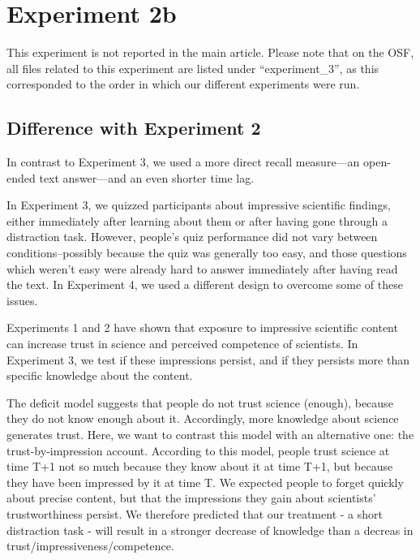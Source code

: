 \documentclass[
  english,
  doc,floatsintext]{apa6}
\begin{document}
\section{Experiment 2b}\label{exp2b}

This experiment is not reported in the main article. Please note that on the OSF, all files related to this experiment are listed under ``experiment\_3'', as this corresponded to the order in which our different experiments were run.

\subsection{Difference with Experiment 2}\label{difference-with-experiment-2}

\FloatBarrier

In contrast to Experiment 3, we used a more direct recall measure---an open-ended text answer---and an even shorter time lag.

In Experiment 3, we quizzed participants about impressive scientific findings, either immediately after learning about them or after having gone through a distraction task. However, people's quiz performance did not vary between conditions--possibly because the quiz was generally too easy, and those questions which weren't easy were already hard to answer immediately after having read the text. In Experiment 4, we used a different design to overcome some of these issues.

Experiments 1 and 2 have shown that exposure to impressive scientific content can increase trust in science and perceived competence of scientists. In Experiment 3, we test if these impressions persist, and if they persists more than specific knowledge about the content.

The deficit model suggests that people do not trust science (enough), because they do not know enough about it. Accordingly, more knowledge about science generates trust. Here, we want to contrast this model with an alternative one: the trust-by-impression account. According to this model, people trust science at time T+1 not so much because they know about it at time T+1, but because they have been impressed by it at time T. We expected people to forget quickly about precise content, but that the impressions they gain about scientists' trustworthiness persist. We therefore predicted that our treatment - a short distraction task - will result in a stronger decrease of knowledge than a decreas in trust/impressiveness/competence.
\end{document}

